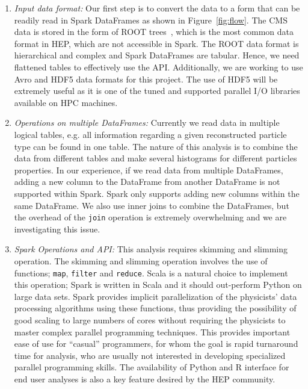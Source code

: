 \documentclass[11pt, twocolumn]{article}
\begin{document}
\begin{enumerate}
\item \textit{Input data format: } 
Our first step is to convert the data to a form that 
can be readily read in Spark DataFrames as shown in Figure~\ref{fig:flow}. 
The CMS data is stored in the form of ROOT trees~\cite{root}, which is the most common 
data format in HEP, which are not accessible in Spark. 
The ROOT data format is hierarchical and complex and Spark DataFrames are tabular. 
Hence, we need flattened tables to effectively use the API. 
Additionally, we are working to use Avro and HDF5 data formats for this project. 
The use of HDF5 will be extremely useful as it is one of the tuned and supported 
parallel I/O libraries available on HPC machines. 

\item \textit{Operations on multiple DataFrames: } 
Currently we read data in multiple logical tables, e.g. all information regarding 
a given reconstructed particle type can be found in one table. The nature of this analysis is to 
combine the data from different tables 
and make several histograms for different particles properties. 
In our experience, if we read data from multiple DataFrames, 
adding a new column to the DataFrame from another 
DataFrame is not supported within Spark. Spark only supports adding new columns within the same DataFrame. 
We also use inner joins to combine the DataFrames, but the overhead of the 
\texttt{join} operation is extremely overwhelming and we are investigating this issue. %

\item \textit{Spark Operations and API: } 
This analysis requires skimming and slimming operation. 
The skimming and slimming operation involves the use of functions; \texttt{map}, \texttt{filter} and 
\texttt{reduce}. 
Scala is a natural choice to implement this operation; Spark is written in Scala and it should out-perform Python on large data sets.  
 Spark provides implicit parallelization of the
physicists' data processing algorithms using these functions, thus providing the possibility
of good scaling to large numbers of cores without requiring the
physicists to master complex parallel programming techniques. This
provides important ease of use for ``casual'' programmers, for whom
the goal is rapid turnaround time for analysis, who are usually not
interested in developing specialized parallel programming
skills. The availability of Python and R interface for end user analyses is also a key feature desired by the HEP community. 
 

\end{enumerate}
\end{document}
